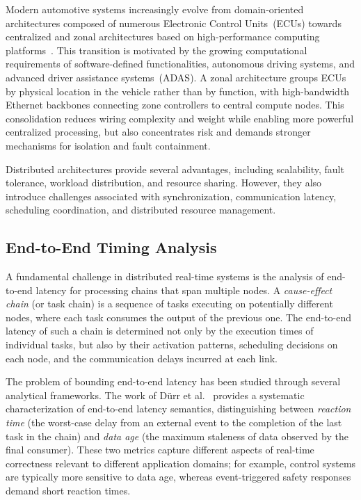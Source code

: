Modern automotive systems increasingly evolve from
domain-oriented architectures composed of numerous Electronic
Control Units~(ECUs) towards centralized and zonal
architectures based on high-performance computing
platforms~\cite{autosar_ap2023,Ayres2024,wang2024ee}. %
This transition
is motivated by the growing computational requirements of
software-defined functionalities, autonomous driving systems,
and advanced driver assistance systems~(ADAS). A zonal
architecture groups ECUs by physical location in the vehicle
rather than by function, with high-bandwidth Ethernet backbones
connecting zone controllers to central compute nodes. This
consolidation reduces wiring complexity and weight while
enabling more powerful centralized processing, but also
concentrates risk and demands stronger mechanisms for
isolation and fault containment.

Distributed architectures provide several advantages,
including scalability, fault tolerance, workload
distribution, and resource sharing. However, they also
introduce challenges associated with synchronization,
communication latency, scheduling coordination, and
distributed resource management.

\subsection{End-to-End Timing Analysis}
\label{subsec:e2e}

A fundamental challenge in distributed real-time systems is
the analysis of end-to-end latency for processing chains
that span multiple nodes. A \emph{cause-effect chain} (or
task chain) is a sequence of tasks executing on potentially
different nodes, where each task consumes the output of the
previous one. The end-to-end latency of such a chain is
determined not only by the execution times of individual
tasks, but also by their activation patterns, scheduling
decisions on each node, and the communication delays
incurred at each link.

The problem of bounding end-to-end latency has been studied
through several analytical frameworks. The work of
Dürr et al.~\cite{durr2019} provides a systematic
characterization of end-to-end latency semantics,
distinguishing between \emph{reaction time} (the worst-case
delay from an external event to the completion of the last
task in the chain) and \emph{data age} (the maximum
staleness of data observed by the final consumer). These
two metrics capture different aspects of real-time
correctness relevant to different application domains;
for example, control systems are typically more sensitive to
data age, whereas event-triggered safety responses demand
short reaction times.

